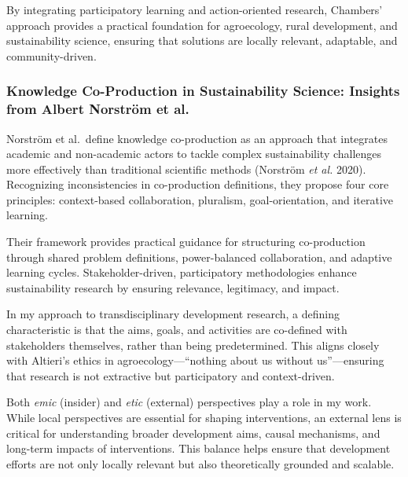 \documentclass[
]{article}
\begin{document}
By integrating participatory learning and action-oriented research,
Chambers' approach provides a practical foundation for agroecology,
rural development, and sustainability science, ensuring that solutions
are locally relevant, adaptable, and community-driven.

\hypertarget{knowledge-co-production-in-sustainability-science-insights-from-albert-norstruxf6m-et-al.}{%
\subsubsection*{Knowledge Co-Production in Sustainability Science:
Insights from Albert Norström et
al.~}\label{knowledge-co-production-in-sustainability-science-insights-from-albert-norstruxf6m-et-al.}}

Norström et al.~define knowledge co-production as an approach that
integrates academic and non-academic actors to tackle complex
sustainability challenges more effectively than traditional scientific
methods (Norström \emph{et al.} 2020). Recognizing inconsistencies in
co-production definitions, they propose four core principles:
context-based collaboration, pluralism, goal-orientation, and iterative
learning.

Their framework provides practical guidance for structuring
co-production through shared problem definitions, power-balanced
collaboration, and adaptive learning cycles. Stakeholder-driven,
participatory methodologies enhance sustainability research by ensuring
relevance, legitimacy, and impact.

In my approach to transdisciplinary development research, a defining
characteristic is that the aims, goals, and activities are co-defined
with stakeholders themselves, rather than being predetermined. This
aligns closely with Altieri's ethics in agroecology---``nothing about us
without us''---ensuring that research is not extractive but
participatory and context-driven.

Both \emph{emic} (insider) and \emph{etic} (external) perspectives play
a role in my work. While local perspectives are essential for shaping
interventions, an external lens is critical for understanding broader
development aims, causal mechanisms, and long-term impacts of
interventions. This balance helps ensure that development efforts are
not only locally relevant but also theoretically grounded and scalable.
\end{document}
